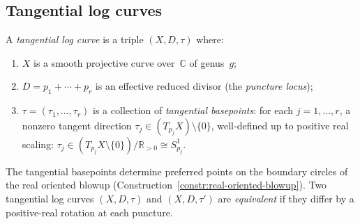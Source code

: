 \subsection{Tangential log curves}
\label{subsec:tangential-log-curves}

\begin{definition}
\label{def:tangential-log-curve}
A \emph{tangential log curve} is a triple $(X, D, \tau)$ where:
\begin{enumerate}[label=\textup{(\roman*)}]
\item $X$ is a smooth projective curve over~$\mathbb{C}$
 of genus~$g$;
\item $D = p_1 + \cdots + p_r$ is an effective reduced divisor
 (the \emph{puncture locus});
\item $\tau = (\tau_1, \ldots, \tau_r)$ is a collection of
 \emph{tangential basepoints}: for each $j = 1, \ldots, r$,
 a nonzero tangent direction
 $\tau_j \in (T_{p_j} X) \setminus \{0\}$, well-defined up to
 positive real scaling:
 $\tau_j \in (T_{p_j} X \setminus \{0\}) / \mathbb{R}_{>0}
 \cong S^1_{p_j}$.
\end{enumerate}
The tangential basepoints determine preferred points on the
boundary circles of the real oriented blowup
(Construction~\ref{constr:real-oriented-blowup}). Two
tangential log curves $(X, D, \tau)$ and $(X, D, \tau')$ are
\emph{equivalent} if they differ by a positive-real rotation
at each puncture.
\end{definition}

